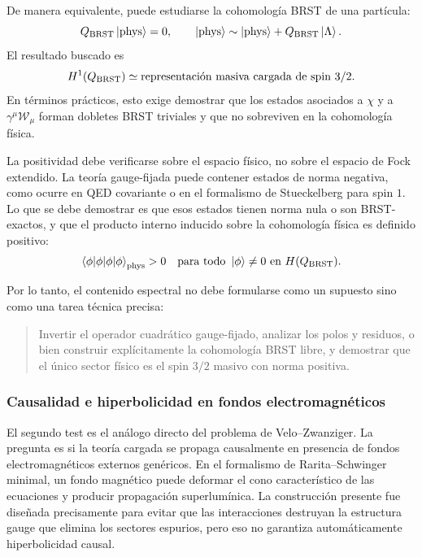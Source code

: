 \documentclass[11pt,a4paper]{article}
\numberwithin{equation}{section}
\newcommand{\Wcal}{\mathcal W}
\begin{document}
De manera equivalente, puede estudiarse la cohomología BRST de una partícula:
\begin{equation}
  Q_{\rm BRST}\ket{\mathrm{phys}}=0,\qquad
  \ket{\mathrm{phys}}\sim
  \ket{\mathrm{phys}}+Q_{\rm BRST}\ket{\Lambda}.
\end{equation}
El resultado buscado es
\begin{equation}
  H^1(Q_{\rm BRST})
  \simeq
  \text{representación masiva cargada de spin }3/2.
\end{equation}
En términos prácticos, esto exige demostrar que los estados asociados a $\chi$ y a
$\gamma^\mu\Wcal_\mu$ forman dobletes BRST triviales y que no sobreviven en la
cohomología física.

La positividad debe verificarse sobre el espacio físico, no sobre el espacio de Fock
extendido. La teoría gauge-fijada puede contener estados de norma negativa, como ocurre
en QED covariante o en el formalismo de Stueckelberg para spin $1$. Lo que se debe
demostrar es que esos estados tienen norma nula o son BRST-exactos, y que el producto
interno inducido sobre la cohomología física es definido positivo:
\begin{equation}
  \braket{\phi|\phi}_{\rm phys}>0
  \quad
  \text{para todo }
  \ket{\phi}\neq 0
  \text{ en }
  H(Q_{\rm BRST}).
\end{equation}

Por lo tanto, el contenido espectral no debe formularse como un supuesto sino como una
tarea técnica precisa:
\begin{quote}
Invertir el operador cuadrático gauge-fijado, analizar los polos y residuos, o bien construir
explícitamente la cohomología BRST libre, y demostrar que el único sector físico es el
spin $3/2$ masivo con norma positiva.
\end{quote}

\subsubsection{Causalidad e hiperbolicidad en fondos electromagnéticos}
\label{subsubsec:causalidad-e-hiperbolicidad-en-fondos-electromagne}

El segundo test es el análogo directo del problema de Velo--Zwanziger. La pregunta es si
la teoría cargada se propaga causalmente en presencia de fondos electromagnéticos
externos genéricos. En el formalismo de Rarita--Schwinger minimal, un fondo magnético
puede deformar el cono característico de las ecuaciones y producir propagación
superlumínica. La construcción presente fue diseñada precisamente para evitar que las
interacciones destruyan la estructura gauge que elimina los sectores espurios, pero eso
no garantiza automáticamente hiperbolicidad causal.
\end{document}
